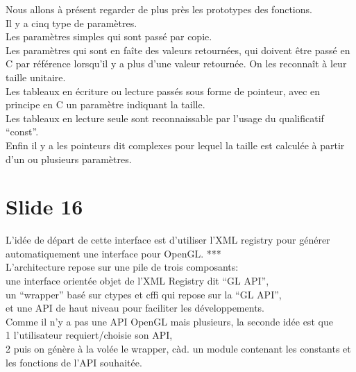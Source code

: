 \documentclass[12pt]{article}
\begin{document}
\noindent%
Nous allons à présent regarder de plus près les prototypes des fonctions. \\

\noindent%
Il y a cinq type de paramètres. \\

\noindent%
Les paramètres simples qui sont passé par copie. \\

\noindent%
Les paramètres qui sont en faîte des valeurs retournées, qui doivent être passé en C par référence
lorsqu'il y a plus d'une valeur retournée. On les reconnaît à leur taille unitaire. \\

\noindent%
Les tableaux en écriture ou lecture passés sous forme de pointeur, avec en principe en C un paramètre
indiquant la taille. \\

\noindent%
Les tableaux en lecture seule sont reconnaissable par l'usage du qualificatif ``const''. \\

\noindent%
Enfin il y a les pointeurs dit complexes pour lequel la taille est calculée à partir d'un ou plusieurs paramètres.

\section{Slide 16}


\noindent%
L'idée de départ de cette interface est d'utiliser l'XML registry pour générer automatiquement une
interface pour OpenGL. *** \\


\noindent%
L'architecture repose sur une pile de trois composants: \\
  une interface orientée objet de l'XML Registry dit ``GL API'', \\
  un ``wrapper'' basé sur ctypes et cffi qui repose sur la ``GL API'', \\
  et une API de haut niveau pour faciliter les développements. \\

\noindent%
Comme il n'y a pas une API OpenGL mais plusieurs, la seconde idée est que \\
  1 l'utilisateur requiert/choisie son API, \\
  2 puis on génère à la volée le wrapper, càd. un module contenant les constants et les fonctions de l'API souhaitée. \\
\end{document}
